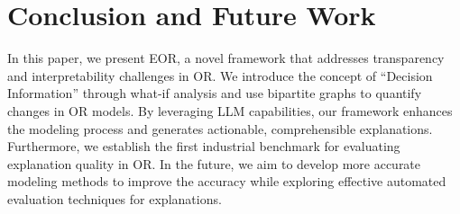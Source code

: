 \section{Conclusion and Future Work}
In this paper, we present EOR, a novel framework that addresses transparency and interpretability challenges in OR. We introduce the concept of ``Decision Information'' through what-if analysis and use bipartite graphs to quantify changes in OR models. By leveraging LLM capabilities, our framework enhances the modeling process and generates actionable, comprehensible explanations. Furthermore, we establish the first industrial benchmark for evaluating explanation quality in OR. In the future, we aim to develop more accurate modeling methods to improve the accuracy while exploring effective automated evaluation techniques for explanations.
